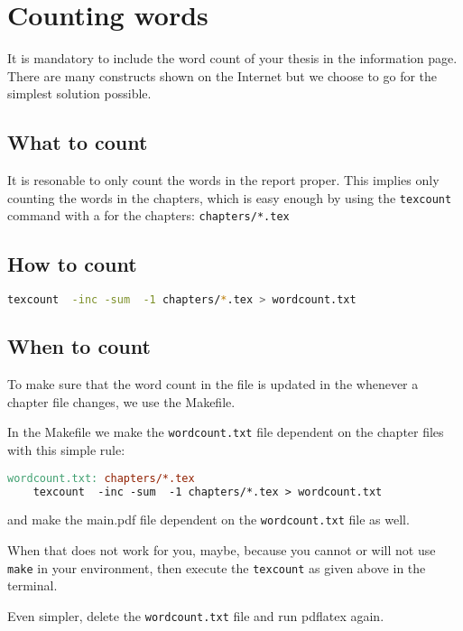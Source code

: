 \chapter{Counting words}

It is mandatory to include the word count of your thesis in the
information page. There are many constructs shown on the Internet but
we choose to go for the simplest solution possible.

\section{What to count}
It is resonable to only count the words in the report proper.
This implies only counting the words in the chapters, which is easy
enough by using the \texttt{texcount} command with a  for the
chapters: \texttt{chapters/*.tex}

\section{How to count}
\begin{lstlisting}[language=sh]
texcount  -inc -sum  -1 chapters/*.tex > wordcount.txt
\end{lstlisting}

\section{When to count}
To make sure that the word count in the file is updated in the
whenever a chapter file changes, we use the Makefile.

In the Makefile we make the \texttt{wordcount.txt} file dependent on the
chapter files with this simple rule:

\begin{lstlisting}[language=make,showtabs]
wordcount.txt: chapters/*.tex
	texcount  -inc -sum  -1 chapters/*.tex > wordcount.txt
\end{lstlisting}

and make the main.pdf file dependent on the \texttt{wordcount.txt} file as
well.

When that does not work for you, maybe, because you cannot or will not
use \texttt{make} in your environment, then execute the
\texttt{texcount} as given above in the terminal.

Even simpler, delete the \texttt{wordcount.txt} file and run pdflatex
again.

